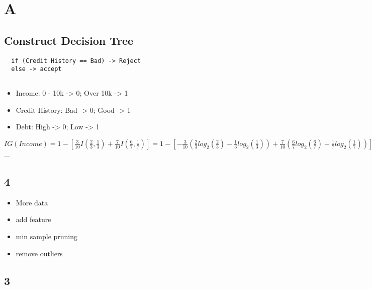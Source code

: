 \documentclass{article}
\begin{document}
\title{}
\author{Wang Xiyu}
\date{}
\maketitle

\section*{A}
\subsection*{Construct Decision Tree}
\begin{lstlisting}
  if (Credit History == Bad) -> Reject
  else -> accept
\end{lstlisting}

\subsection*{}
\begin{itemize}
  \item Income: 0 - 10k -> 0; Over 10k -> 1
  \item Credit History: Bad -> 0; Good -> 1
  \item Debt: High -> 0; Low -> 1
\end{itemize}

$IG(Income) = 1 - [\frac{3}{10}I(\frac{2}{3}, \frac{1}{3}) + \frac{7}{10}I(\frac{6}{7}, \frac{1}{7})] = 
1 - [-\frac{3}{10}(\frac{2}{3}log_2(\frac{2}{3}) - \frac{1}{3}log_2(\frac{1}{3})) + \frac{7}{10}(\frac{6}{7}log_2(\frac{6}{7})- \frac{1}{7}log_2(\frac{1}{7}))]
= 1 - [\frac{3}{10}(\frac{2}{3}(log_2(2) - log_2(3) - ))]$...

\subsection*{4}
\begin{itemize}
    \item More data
    \item add feature
    \item min sample pruning
    \item remove outliers
\end{itemize}
\subsection*{3}




\end{document}
